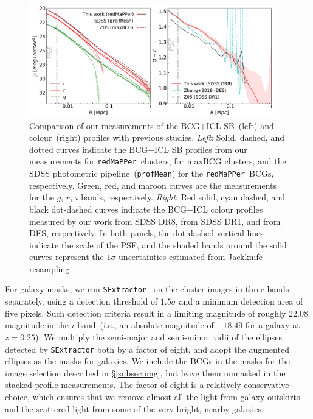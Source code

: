 \documentclass[fleqn,usenatbib]{mnras}
\newcommand\redmapper{\texttt{redMaPPer}}
\begin{document}
\begin{figure}
    \centering\includegraphics[width=0.96\textwidth]{fig/total_sample_compare_to_Z05.pdf}
    \caption{Comparison of our measurements of the BCG+ICL SB~(left) and
    colour~(right) profiles with previous studies. {\it Left}: Solid,
    dashed, and dotted curves indicate the BCG+ICL SB profiles from our
    measurements for \redmapper~clusters,  for
    maxBCG clusters, and the SDSS photometric pipeline~(\texttt{profMean})
    for the \redmapper~BCGs, respectively. Green, red, and maroon curves
    are the measurements for the $g$, $r$, $i$ bands, respectively.  {\it
    Right}: Red solid, cyan dashed, and black dot-dashed curves indicate
    the BCG+ICL colour profiles measured by our work from SDSS DR8,
     from SDSS DR1, and \citet{Zhang2019} from
    DES, respectively.  In both panels, the dot-dashed vertical lines
    indicate the scale of the PSF, and the shaded bands around the solid
    curves represent the $1\sigma$ uncertainties estimated from Jackknife
    resampling.  \label{fig:Z05_comparison}}
\end{figure}


For galaxy masks, we run \texttt{SExtractor}~\citep{Bertin1996} on the
cluster images in three bands separately, using a detection threshold of
$1.5\sigma$ and a minimum detection area of five pixels. Such detection
criteria result in a limiting magnitude of roughly $22.08$ magnitude in the
$i$ band~(i.e., an absolute magnitude of $-18.49$ for a galaxy at
$z{=}0.25$). We multiply the semi-major and semi-minor radii of the
ellipses detected by \texttt{SExtractor} both by a factor of eight, and
adopt the augmented ellipses as the masks for galaxies. We include the BCGs
in the masks for the image selection described in \S\ref{subsec:img}, but
leave them unmasked in the stacked profile measurements. The factor of
eight is a relatively conservative choice, which ensures that we remove
almost all the light from galaxy outskirts and the scattered
light from some of the very bright, nearby galaxies.
\end{document}
